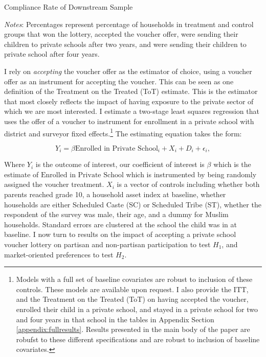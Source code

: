 \documentclass[hidelinks, 12pt, titlepage]{article}
\begin{document}
	\begin{table}
		\begin{threeparttable}
			\caption{Compliance Rate of Downstream Sample\label{table:compliance_downstream}}
			\centering
			
			\begin{tablenotes}
				\item \emph{Notes}: Percentages represent percentage of households in treatment and control groups that won the lottery, accepted the voucher offer, were sending their children to private schools after two years, and were sending their children to private school after four years.
			\end{tablenotes}
		\end{threeparttable}
	\end{table}

	I rely on \emph{accepting} the voucher offer as the estimator of choice, using a voucher offer as an instrument for accepting the voucher. This can be seen as one definition of the Treatment on the Treated (ToT) estimate.  This is the estimator that most closely reflects the impact of having exposure to the private sector of which we are most interested.  I estimate a two-stage least squares regression that uses the offer of a voucher to instrument for enrollment in a private school with district and surveyor fixed effects.\footnote{Models with a full set of baseline covariates are robust to inclusion of these controls.  These models are available upon request.  I also provide the ITT, and the Treatment on the Treated (ToT) on having accepted the voucher, enrolled their child in a private school, and stayed in a private school for two and four years in that school in the tables in Appendix Section \ref{appendix:fullresults}.  Results presented in the main body of the paper are robufst to these different specifications and are robust to inclusion of baseline covariates.}  The estimating equation takes the form:

\begin{equation}
Y_{i} = \beta\text{Enrolled in Private School}_{i} + X_{i} + D_{i} + \epsilon_{i}, \label{equation}
\end{equation}

Where $Y_{i}$ is the outcome of interest, our coefficient of interest is $\beta$ which is the estimate of $\text{Enrolled in Private School}$ which is instrumented by being randomly assigned the voucher treatment.  $X_{i}$ is a vector of controls including whether both parents reached grade 10, a household asset index at baseline, whether households are either Scheduled Caste (SC) or Scheduled Tribe (ST), whether the respondent of the survey was male, their age, and a dummy for Muslim households.  Standard errors are clustered at the school the child was in at baseline.  I now turn to results on the impact of accepting a private school voucher lottery on partisan and non-partisan participation to test $H_{1}$, and market-oriented preferences to test $H_{2}$.
\end{document}
